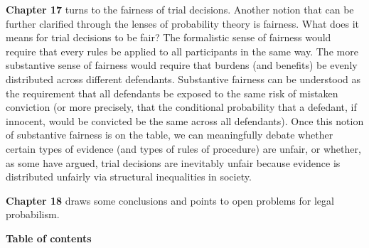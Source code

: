 \documentclass[
  10pt,
  dvipsnames,enabledeprecatedfontcommands]{scrartcl}
\begin{document}
\textbf{Chapter 17} turns to the fairness of trial decisions. Another
notion that can be further clarified through the lenses of probability
theory is fairness. What does it means for trial decisions to be fair?
The formalistic sense of fairness would require that every rules be
applied to all participants in the same way. The more substantive sense
of fairness would require that burdens (and benefits) be evenly
distributed across different defendants. Substantive fairness can be
understood as the requirement that all defendants be exposed to the same
risk of mistaken conviction (or more precisely, that the conditional
probability that a defedant, if innocent, would be convicted be the same
across all defendants). Once this notion of substantive fairness is on
the table, we can meaningfully debate whether certain types of evidence
(and types of rules of procedure) are unfair, or whether, as some have
argued, trial decisions are inevitably unfair because evidence is
distributed unfairly via structural inequalities in society.

\textbf{Chapter 18} draws some conclusions and points to open problems
for legal probabilism. 


\vspace{3mm}

\noindent \textbf{Table of contents}

\renewcommand{\labelenumi}{\Roman{enumi}}
\renewcommand{\labelenumii}{\arabic{enumii}}
\renewcommand{\labelenumiii}{\arabic{enumii}.\arabic{enumiii}}
\end{document}
